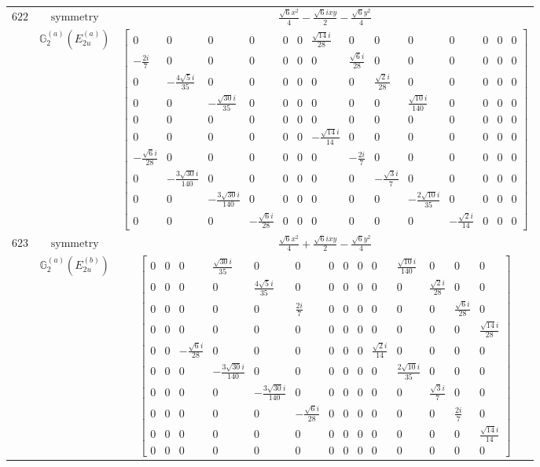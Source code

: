 \documentclass[fleqn,8pt,landscape]{jsarticle}
\begin{document}
\begin{longtable}{ccc}
$ 622 $ & $ \text{symmetry} $ & $ \frac{\sqrt{6} x^{2}}{4} - \frac{\sqrt{6} i x y}{2} - \frac{\sqrt{6} y^{2}}{4} $ \\
$  $ & $ \mathbb{G}_{2}^{(a)}(E_{2u}^{(a)}) $ & $ \begin{bmatrix} 0 & 0 & 0 & 0 & 0 & 0 & \frac{\sqrt{14} i}{28} & 0 & 0 & 0 & 0 & 0 & 0 & 0 \\ - \frac{2 i}{7} & 0 & 0 & 0 & 0 & 0 & 0 & \frac{\sqrt{6} i}{28} & 0 & 0 & 0 & 0 & 0 & 0 \\ 0 & - \frac{4 \sqrt{5} i}{35} & 0 & 0 & 0 & 0 & 0 & 0 & \frac{\sqrt{2} i}{28} & 0 & 0 & 0 & 0 & 0 \\ 0 & 0 & - \frac{\sqrt{30} i}{35} & 0 & 0 & 0 & 0 & 0 & 0 & \frac{\sqrt{10} i}{140} & 0 & 0 & 0 & 0 \\ 0 & 0 & 0 & 0 & 0 & 0 & 0 & 0 & 0 & 0 & 0 & 0 & 0 & 0 \\ 0 & 0 & 0 & 0 & 0 & 0 & - \frac{\sqrt{14} i}{14} & 0 & 0 & 0 & 0 & 0 & 0 & 0 \\ - \frac{\sqrt{6} i}{28} & 0 & 0 & 0 & 0 & 0 & 0 & - \frac{2 i}{7} & 0 & 0 & 0 & 0 & 0 & 0 \\ 0 & - \frac{3 \sqrt{30} i}{140} & 0 & 0 & 0 & 0 & 0 & 0 & - \frac{\sqrt{3} i}{7} & 0 & 0 & 0 & 0 & 0 \\ 0 & 0 & - \frac{3 \sqrt{30} i}{140} & 0 & 0 & 0 & 0 & 0 & 0 & - \frac{2 \sqrt{10} i}{35} & 0 & 0 & 0 & 0 \\ 0 & 0 & 0 & - \frac{\sqrt{6} i}{28} & 0 & 0 & 0 & 0 & 0 & 0 & - \frac{\sqrt{2} i}{14} & 0 & 0 & 0 \end{bmatrix} $ \\ \hline
$ 623 $ & $ \text{symmetry} $ & $ \frac{\sqrt{6} x^{2}}{4} + \frac{\sqrt{6} i x y}{2} - \frac{\sqrt{6} y^{2}}{4} $ \\
$  $ & $ \mathbb{G}_{2}^{(a)}(E_{2u}^{(b)}) $ & $ \begin{bmatrix} 0 & 0 & 0 & \frac{\sqrt{30} i}{35} & 0 & 0 & 0 & 0 & 0 & 0 & \frac{\sqrt{10} i}{140} & 0 & 0 & 0 \\ 0 & 0 & 0 & 0 & \frac{4 \sqrt{5} i}{35} & 0 & 0 & 0 & 0 & 0 & 0 & \frac{\sqrt{2} i}{28} & 0 & 0 \\ 0 & 0 & 0 & 0 & 0 & \frac{2 i}{7} & 0 & 0 & 0 & 0 & 0 & 0 & \frac{\sqrt{6} i}{28} & 0 \\ 0 & 0 & 0 & 0 & 0 & 0 & 0 & 0 & 0 & 0 & 0 & 0 & 0 & \frac{\sqrt{14} i}{28} \\ 0 & 0 & - \frac{\sqrt{6} i}{28} & 0 & 0 & 0 & 0 & 0 & 0 & \frac{\sqrt{2} i}{14} & 0 & 0 & 0 & 0 \\ 0 & 0 & 0 & - \frac{3 \sqrt{30} i}{140} & 0 & 0 & 0 & 0 & 0 & 0 & \frac{2 \sqrt{10} i}{35} & 0 & 0 & 0 \\ 0 & 0 & 0 & 0 & - \frac{3 \sqrt{30} i}{140} & 0 & 0 & 0 & 0 & 0 & 0 & \frac{\sqrt{3} i}{7} & 0 & 0 \\ 0 & 0 & 0 & 0 & 0 & - \frac{\sqrt{6} i}{28} & 0 & 0 & 0 & 0 & 0 & 0 & \frac{2 i}{7} & 0 \\ 0 & 0 & 0 & 0 & 0 & 0 & 0 & 0 & 0 & 0 & 0 & 0 & 0 & \frac{\sqrt{14} i}{14} \\ 0 & 0 & 0 & 0 & 0 & 0 & 0 & 0 & 0 & 0 & 0 & 0 & 0 & 0 \end{bmatrix} $ \\ \hline

\end{longtable}
\end{document}
